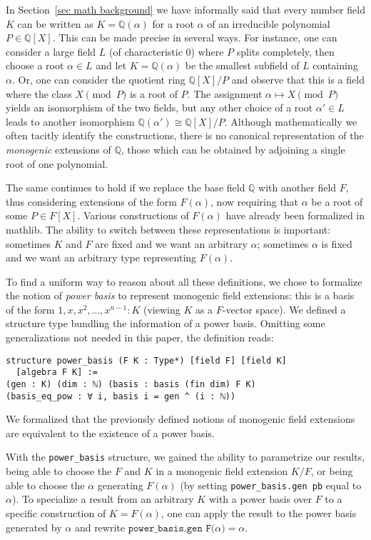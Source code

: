 \documentclass[sn-mathphys]{sn-jnl}%
\newcommand{\lean}[1]{\texttt{#1}\xspace}
\newcommand{\mathlib}{\textsf{mathlib}\xspace}
\newcommand{\QQ}{\mathbb{Q}}
\begin{document}
In Section~\ref{sec math background} we have informally said that every number field $K$ can be written as $K=\QQ(\alpha)$ for a root $\alpha$ of an irreducible polynomial $P\in\QQ[X]$. This can be made precise in several ways. For instance, one can consider a large field $L$ (of characteristic $0$) where $P$ splits completely, then choose a root $\alpha\in L$ and let $K = \QQ(\alpha)$ be the smallest subfield of $L$ containing $\alpha$. Or, one can consider the quotient ring $\QQ[X]/P$ and observe that this is a field where the class $X\pmod{P}$ is a root of $P$. The assignment $\alpha\mapsto X\pmod{P}$ yields an isomorphism of the two fields, but any other choice of a root $\alpha'\in L$ leads to another isomorphism $\QQ(\alpha')\cong \QQ[X]/P$. Although mathematically we often tacitly identify the constructions, there is no canonical representation of the \emph{monogenic} extensions of $\QQ$, those which can be obtained by adjoining a single root of one polynomial.

The same continues to hold if we replace the base field $\QQ$ with another field $F$, thus considering extensions of the form $F(\alpha)$, now requiring that $\alpha$ be a root of some $P\in F[X]$. Various constructions of $F(\alpha)$ have already been formalized in \mathlib. The ability to switch between these representations is important: sometimes $K$ and $F$ are fixed and we want an arbitrary $\alpha$; sometimes $\alpha$ is fixed and we want an arbitrary type representing $F(\alpha)$.

To find a uniform way to reason about all these definitions,
we chose to formalize the notion of \emph{power basis} to represent monogenic field extensions: this is a basis of the form $1, x, x^2, \dots, x^{n-1} : K$ (viewing $K$ as a $F$-vector space).
We defined a structure type bundling the information of a power basis.
Omitting some generalizations not needed in this paper, the definition reads:
\begin{lstlisting}
structure power_basis (F K : Type*) [field F] [field K]
  [algebra F K] :=
(gen : K) (dim : ℕ) (basis : basis (fin dim) F K)
(basis_eq_pow : ∀ i, basis i = gen ^ (i : ℕ))
\end{lstlisting}
We formalized that the previously defined notions of monogenic field extensions are equivalent to the existence of a power basis.

With the \lean{power\_basis} structure, we gained the ability to parametrize our results,
being able to choose the $F$ and $K$ in a monogenic field extension $K / F$, or being able to choose the $\alpha$ generating $F(\alpha)$ (by setting \lean{power\_basis.gen\ pb} equal to $\alpha$).
To specialize a result from an arbitrary $K$ with a power basis over $F$ to a specific construction of $K = F(\alpha)$,
one can apply the result to the power basis generated by $\alpha$ and rewrite $\lean{power\_basis.gen F($\alpha$)} = \alpha$.
\end{document}
